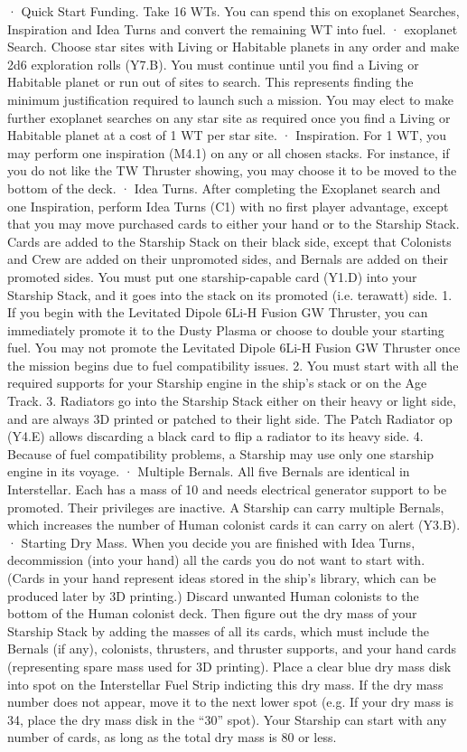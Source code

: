 \documentclass[a4paper]{book}
\begin{document}
·       Quick Start Funding. Take 16 WTs. You can spend this on exoplanet Searches, Inspiration and Idea Turns and convert the remaining WT into fuel.
·       exoplanet Search. Choose star sites with Living or Habitable planets in any order and make 2d6 exploration rolls (Y7.B). You must continue until you find a Living or Habitable planet or run out of sites to search. This represents finding the minimum justification required to launch such a mission. You may elect to make further exoplanet searches on any star site as required once you find a Living or Habitable planet at a cost of 1 WT per star site.
·       Inspiration. For 1 WT, you may perform one inspiration (M4.1) on any or all chosen stacks. For instance, if you do not like the TW Thruster showing, you may choose it to be moved to the bottom of the deck.
·       Idea Turns. After completing the Exoplanet search and one Inspiration, perform Idea Turns (C1) with no first player advantage, except that you may move purchased cards to either your hand or to the Starship Stack. Cards are added to the Starship Stack on their black side, except that Colonists and Crew are added on their unpromoted sides, and Bernals are added on their promoted sides. You must put one starship-capable card (Y1.D) into your Starship Stack, and it goes into the stack on its promoted (i.e. terawatt) side.
1. If you begin with the Levitated Dipole 6Li-H Fusion GW Thruster, you can immediately promote it to the Dusty Plasma or choose to double your starting fuel. You may not promote the Levitated Dipole 6Li-H Fusion GW Thruster once the mission begins due to fuel compatibility issues.
2. You must start with all the required supports for your Starship engine in the ship’s stack or on the Age Track.
3. Radiators go into the Starship Stack either on their heavy or light side, and are always 3D printed or patched to their light side. The Patch Radiator op (Y4.E) allows discarding a black card to flip a radiator to its heavy side.
4. Because of fuel compatibility problems, a Starship may use only one starship engine in its voyage.
·       Multiple Bernals. All five Bernals are identical in Interstellar. Each has a mass of 10 and needs electrical generator support to be promoted. Their privileges are inactive. A Starship can carry multiple Bernals, which increases the number of Human colonist cards it can carry on alert (Y3.B).
·       Starting Dry Mass. When you decide you are finished with Idea Turns, decommission (into your hand) all the cards you do not want to start with. (Cards in your hand represent ideas stored in the ship’s library, which can be produced later by 3D printing.) Discard unwanted Human colonists to the bottom of the Human colonist deck. Then figure out the dry mass of your Starship Stack by adding the masses of all its cards, which must include the Bernals (if any), colonists, thrusters, and thruster supports, and your hand cards (representing spare mass used for 3D printing).  Place a clear blue dry mass disk into spot on the Interstellar Fuel Strip indicting this dry mass. If the dry mass number does not appear, move it to the next lower spot (e.g. If your dry mass is 34, place the dry mass disk in the “30” spot). Your Starship can start with any number of cards, as long as the total dry mass is 80 or less.
\end{document}
